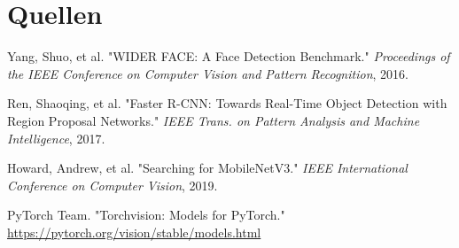 \documentclass[11pt,a4paper]{article}
\begin{document}
\section{Quellen}
\begin{thebibliography}{9}
 Yang, Shuo, et al. "WIDER FACE: A Face Detection Benchmark." \emph{Proceedings of the IEEE Conference on Computer Vision and Pattern Recognition}, 2016.

 Ren, Shaoqing, et al. "Faster R-CNN: Towards Real-Time Object Detection with Region Proposal Networks." \emph{IEEE Trans. on Pattern Analysis and Machine Intelligence}, 2017.

 Howard, Andrew, et al. "Searching for MobileNetV3." \emph{IEEE International Conference on Computer Vision}, 2019.

 PyTorch Team. "Torchvision: Models for PyTorch." \url{https://pytorch.org/vision/stable/models.html}
\end{thebibliography}
\end{document}
